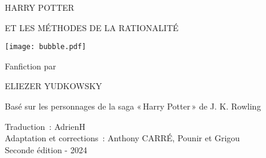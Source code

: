 
\begin{center}
\thispagestyle{empty}
{\hpfont
\Huge\MakeUppercase{Harry Potter}\vspace*{0.5cm}

\Large\MakeUppercase{et les Méthodes de la Rationalité} %

\texttt{[image: bubble.pdf]}

\Large Fanfiction par \vspace*{.25cm}

\huge \MakeUppercase{Eliezer Yudkowsky}%

\normalsize

\vspace*{1\baselineskip}
\fullvolumetitle{\volumenumber}
}

\vspace{0.7cm}

Basé sur les personnages de la saga « Harry Potter » de J. K. Rowling

\vspace{0.7cm}

Traduction~: AdrienH\\
Adaptation et corrections~: Anthony CARRÉ, Pounir et Grigou\\
Seconde édition - 2024

\end{center}


